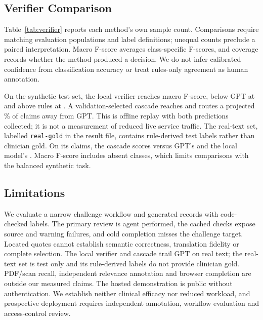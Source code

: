 \documentclass[10pt]{article}
\begin{document}
\subsection{Verifier Comparison}
Table~\ref{tab:verifier} reports each method's own sample count. Comparisons require
matching evaluation populations and label definitions; unequal counts preclude a
paired interpretation. Macro F-score averages class-specific F-scores, and coverage
records whether the method produced a decision. We do not infer calibrated confidence
from classification accuracy or treat rules-only agreement as human annotation.
\begin{table}[!htbp]
\centering

\caption{Verifier results on synthetic held-out generation families, kept separate from
held-out mutation experiments and real-patient weak labels. Median latency is specific
to the saved evaluation conditions.}
\label{tab:verifier}
\end{table}
On the synthetic test set, the local verifier reaches \LocalVerifierFscore{}
macro F-score, below GPT at \ProxyVerifierFscore{} and above rules at
\RulesVerifierFscore{}. A validation-selected cascade reaches
\CascadeVerifierFscore{} and routes a projected \CascadeSavedPercent{}\% of claims
away from GPT. This is offline replay with both predictions collected; it is not a
measurement of reduced live service traffic. The real-text set, labelled
\texttt{real-gold} in the result file, contains rule-derived test labels rather than
clinician gold. On its \ProxyRealN{} claims, the cascade scores
\CascadeRealFscore{} versus GPT's \ProxyRealFscore{} and the local model's
\LocalRealFscore{}. Macro F-score includes absent classes, which limits comparisons
with the balanced synthetic task.

\FloatBarrier

\subsection{Limitations}
We evaluate a narrow challenge workflow and generated records with code-checked
labels. The primary review is agent performed, the cached checks expose source and
warning failures, and cold completion misses the challenge target. Located quotes
cannot establish semantic correctness, translation fidelity or complete selection.
The local verifier and cascade trail GPT on real text; the real-text set is test
only and its rule-derived labels do not provide clinician gold. PDF/scan recall,
independent relevance annotation and browser completion are outside our measured
claims. The hosted demonstration is public without authentication. We establish
neither clinical efficacy nor reduced workload, and prospective deployment requires
independent annotation, workflow evaluation and access-control review.
\end{document}
